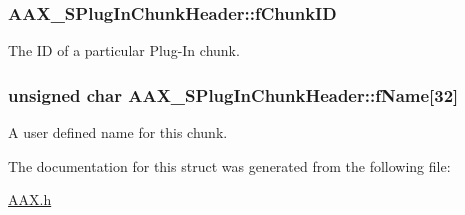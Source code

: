 \subsubsection[{f\+Chunk\+I\+D}]{ A\+A\+X\+\_\+\+S\+Plug\+In\+Chunk\+Header\+::f\+Chunk\+I\+D}\label{a00126_a01307400067d1777c304624ffb5e0a8c}


The I\+D of a particular Plug-\/\+In chunk. 

\hypertarget{a00126_a84bee19fce5aeb2c429d872430cb8dab}{}
\subsubsection[{f\+Name}]{\setlength{\rightskip}{0pt plus 5cm}unsigned char A\+A\+X\+\_\+\+S\+Plug\+In\+Chunk\+Header\+::f\+Name\mbox{[}32\mbox{]}}\label{a00126_a84bee19fce5aeb2c429d872430cb8dab}


A user defined name for this chunk. 



The documentation for this struct was generated from the following file\+:\begin{DoxyCompactItemize}
\item 
\hyperlink{a00149}{A\+A\+X.\+h}\end{DoxyCompactItemize}
